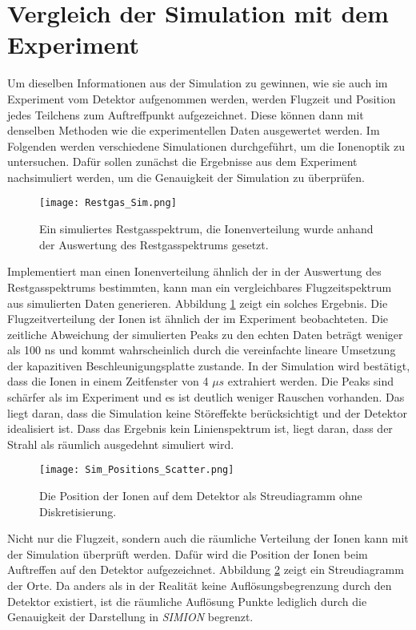 \section{Vergleich der Simulation mit dem Experiment}
Um dieselben Informationen aus der Simulation zu gewinnen, wie sie auch im Experiment vom Detektor aufgenommen werden, werden Flugzeit und Position jedes Teilchens zum Auftreffpunkt aufgezeichnet. Diese können dann mit denselben Methoden wie die experimentellen Daten ausgewertet werden. Im Folgenden werden verschiedene Simulationen durchgeführt, um die Ionenoptik zu untersuchen. Dafür sollen zunächst die Ergebnisse aus dem Experiment nachsimuliert werden, um die Genauigkeit der Simulation zu überprüfen. 


\begin{figure}
    \centering
    \texttt{[image: Restgas\_Sim.png]}
    \caption[Simuliertes Restgasspektrum]{Ein simuliertes Restgasspektrum, die Ionenverteilung wurde anhand der Auswertung des Restgasspektrums gesetzt.}
    \label{fig:Restgas_Sim}
\end{figure}

Implementiert man einen Ionenverteilung ähnlich der in der Auswertung des Restgasspektrums bestimmten, kann man ein vergleichbares Flugzeitspektrum aus simulierten Daten generieren. Abbildung \ref{fig:Restgas_Sim} zeigt ein solches Ergebnis. Die Flugzeitverteilung der Ionen ist ähnlich der im Experiment beobachteten. Die zeitliche Abweichung der simulierten Peaks zu den echten Daten beträgt weniger als 100 ns und kommt wahrscheinlich durch die vereinfachte lineare Umsetzung der kapazitiven Beschleunigungsplatte zustande. In der Simulation wird bestätigt, dass die Ionen in einem Zeitfenster von 4 $\mu s$ extrahiert werden. Die Peaks sind schärfer als im Experiment und es ist deutlich weniger Rauschen vorhanden. Das liegt daran, dass die Simulation keine Störeffekte berücksichtigt und der Detektor idealisiert ist. Dass das Ergebnis kein Linienspektrum ist, liegt daran, dass der Strahl als räumlich ausgedehnt simuliert wird.

\begin{figure}[H]
    \centering
    \texttt{[image: Sim\_Positions\_Scatter.png]}
    \caption[Streudiagramm der simulierten Ionenposition auf dem Detektor ]{Die Position der Ionen auf dem Detektor als Streudiagramm ohne Diskretisierung.}
    \label{fig:sim_pos_scatter}
\end{figure}

Nicht nur die Flugzeit, sondern auch die räumliche Verteilung der Ionen kann mit der Simulation überprüft werden. Dafür wird die Position der Ionen beim Auftreffen auf den Detektor aufgezeichnet. Abbildung \ref{fig:sim_pos_scatter} zeigt ein Streudiagramm der Orte. Da anders als in der Realität keine Auflösungsbegrenzung durch den Detektor existiert, ist die räumliche Auflösung Punkte lediglich durch die Genauigkeit der Darstellung in \textit{SIMION} begrenzt.

